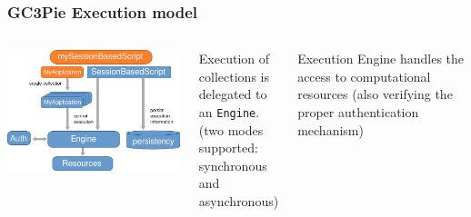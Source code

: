 \documentclass[english,serif,mathserif,xcolor=pdftex,dvipsnames,table]{beamer}
\begin{document}
\begin{frame}
  \frametitle{GC3Pie Execution model}
  \begin{columns}
      \includegraphics[width=1\textwidth]{fig/GC3Pie_execution_model}
  \begin{block}{}
    Execution of collections is delegated to an \texttt{Engine}.\\
    (two modes supported: {\color{Blue}synchronous} and {\color{Blue}asynchronous})
  \end{block}

  \begin{block}{}
    Execution Engine handles the access to computational {\color{Blue}resources}
    (also verifying the proper {\color{Blue}authentication} mechanism)
  \end{block}
  \end{columns}
\end{frame}
\end{document}
